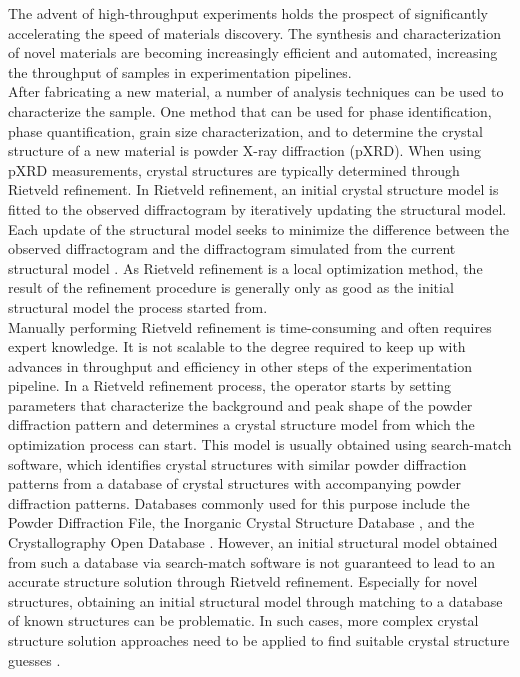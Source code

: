 The advent of high-throughput experiments holds the prospect of significantly accelerating the speed of materials discovery\cite{Liu2019}. The synthesis and characterization of novel materials are becoming increasingly efficient and automated, increasing the throughput of samples in experimentation pipelines\cite{MacLeod2019, Ludwig2019, Ozaki2020}. \\

After fabricating a new material, a number of analysis techniques can be used to characterize the sample. One method that can be used for phase identification, phase quantification, grain size characterization, and to determine the crystal structure of a new material is powder X-ray diffraction (pXRD). 
When using pXRD measurements, crystal structures are typically determined through Rietveld refinement. In Rietveld refinement, an initial crystal structure model is fitted to the observed diffractogram by iteratively updating the structural model. Each update of the structural model seeks to minimize the difference between the observed diffractogram and the diffractogram simulated from the current structural model \cite{Dinnebier2019, Cano2021}. As Rietveld refinement is a local optimization method, the result of the refinement procedure is generally only as good as the initial structural model the process started from. \\

Manually performing Rietveld refinement is time-consuming and often requires expert knowledge. It is not scalable to the degree required to keep up with advances in throughput and efficiency in other steps of the experimentation pipeline. In a Rietveld refinement process, the operator starts by setting parameters that characterize the background and peak shape of the powder diffraction pattern and determines a crystal structure model from which the optimization process can start. This model is usually obtained using search-match software, which identifies crystal structures with similar powder diffraction patterns from a database of crystal structures with accompanying powder diffraction patterns. Databases commonly used for this purpose include the Powder Diffraction File\cite{GatesRector2019}, the Inorganic Crystal Structure Database \cite{Belsky2002}, and the Crystallography Open Database \cite{Grazulis2009}. However, an initial structural model obtained from such a database via search-match software is not guaranteed to lead to an accurate structure solution through Rietveld refinement. Especially for novel structures, obtaining an initial structural model through matching to a database of known structures can be problematic. In such cases, more complex crystal structure solution approaches need to be applied to find suitable crystal structure guesses \cite{structure_solution_review}.\\

